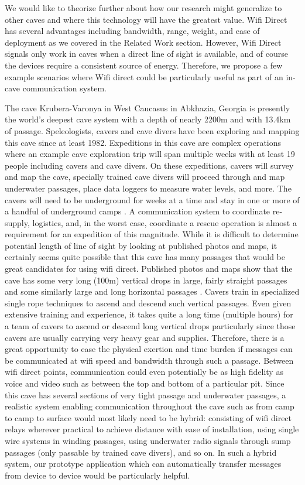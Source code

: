 \documentclass[10pt,twocolumn]{article}
\begin{document}
We would like to theorize further about how our research might generalize to other caves and where this technology will have the greatest value.
Wifi Direct has several advantages including bandwidth, range, weight, and ease of deployment as we covered in the Related Work section.
However, Wifi Direct signals only work in caves when a direct line of sight is available, 
and of course the devices require a consistent source of energy.
Therefore, we propose a few example scenarios where Wifi direct could be particularly useful as part of an in-cave communication system.

The cave Krubera-Varonya in West Caucasus in Abkhazia, Georgia is presently the world's deepest cave system with a depth of nearly 2200m and with 13.4km of passage. 
Speleologists, cavers and cave divers have been exploring and mapping this cave since at least 1982.
Expeditions in this cave are complex operations where an example cave exploration trip will span multiple weeks with at least 19 people including cavers and cave divers.
On these expeditions, cavers will survey and map the cave, specially trained cave divers will proceed through and map underwater passages, place data loggers to measure water levels, and more.
The cavers will need to be underground for weeks at a time and stay in one or more of a handful of underground camps \cite{krub_it}.
A communication system to coordinate re-supply, logistics, and, in the worst case, coordinate a rescue operation is almost a requirement for an expedition of this magnitude.
While it is difficult to determine potential length of line of sight by looking at published photos and maps, 
it certainly seems quite possible that this cave has many passages that would be great candidates for using wifi direct.
Published photos and maps show that the cave has some very long (100m) vertical drops in large, fairly straight passages and some similarly large and long horizontal passages \cite{krub_it}.
Cavers train in specialized single rope techniques to ascend and descend such vertical passages.
Even given extensive training and experience, it takes quite a long time (multiple hours) for a team of cavers to ascend or descend long vertical drops particularly since those cavers are usually carrying very heavy gear and supplies.
Therefore, there is a great opportunity to ease the physical exertion and time burden if messages can be communicated at wifi speed and bandwidth through such a passage.
Between wifi direct points, communication could even potentially be as high fidelity as voice and video such as between the top and bottom of a particular pit.
Since this cave has several sections of very tight passage and underwater passages,
a realistic system enabling communication throughout the cave such as from camp to camp to surface would most likely need to be hybrid:
consisting of wifi direct relays wherever practical to achieve distance with ease of installation, using single wire systems in winding passages, using underwater radio signals through sump passages (only passable by trained cave divers), and so on.
In such a hybrid system, our prototype application which can automatically transfer messages from device to device would be particularly helpful.
\end{document}
